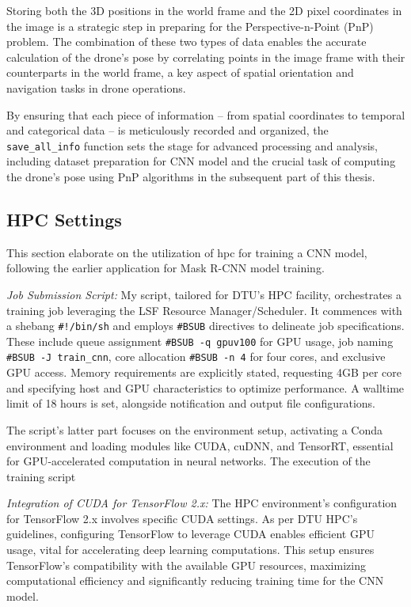 Storing both the 3D positions in the world frame and the 2D pixel coordinates in the image is a strategic step in preparing for the Perspective-n-Point (PnP) problem. The combination of these two types of data enables the accurate calculation of the drone's pose by correlating points in the image frame with their counterparts in the world frame, a key aspect of spatial orientation and navigation tasks in drone operations.

By ensuring that each piece of information – from spatial coordinates to temporal and categorical data – is meticulously recorded and organized, the \texttt{save\_all\_info} function sets the stage for advanced processing and analysis, including dataset preparation for CNN model and the crucial task of computing the drone's pose using PnP algorithms in the subsequent part of this thesis.


\subsection{HPC Settings}
This section elaborate on the utilization of \acrshort{hpc} for training a CNN model, following the earlier application for Mask R-CNN model training. 

\textit{Job Submission Script:}
My script, tailored for DTU's HPC facility, orchestrates a training job leveraging the LSF Resource Manager/Scheduler. It commences with a shebang \texttt{\#!/bin/sh} and employs \texttt{\#BSUB} directives to delineate job specifications. These include queue assignment \texttt{\#BSUB -q gpuv100} for GPU usage, job naming \texttt{\#BSUB -J train\_cnn}, core allocation \texttt{\#BSUB -n 4} for four cores, and exclusive GPU access. Memory requirements are explicitly stated, requesting 4GB per core and specifying host and GPU characteristics to optimize performance. A walltime limit of 18 hours is set, alongside notification and output file configurations.

The script's latter part focuses on the environment setup, activating a Conda environment and loading modules like CUDA, cuDNN, and TensorRT, essential for GPU-accelerated computation in neural networks. The execution of the training script 

\textit{Integration of CUDA for TensorFlow 2.x:} The HPC environment's configuration for TensorFlow 2.x involves specific CUDA settings. As per DTU HPC's guidelines\cite{dtu_hpc_cuda}, configuring TensorFlow to leverage CUDA enables efficient GPU usage, vital for accelerating deep learning computations. This setup ensures TensorFlow's compatibility with the available GPU resources, maximizing computational efficiency and significantly reducing training time for the CNN model.
